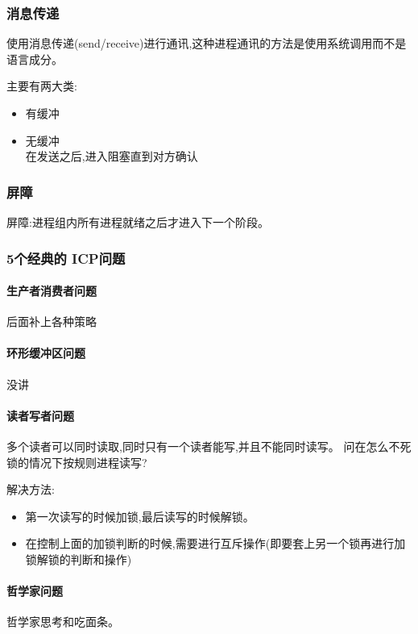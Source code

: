 \documentclass[UTF8,a4paper]{ctexart}
\begin{document}
      \subsubsection{消息传递}
      使用消息传递(send/receive)进行通讯,这种进程通讯的方法是使用系统调用而不是语言成分。

      主要有两大类:
      \begin{itemize}
        \item 有缓冲
        \item 无缓冲\\
        在发送之后,进入阻塞直到对方确认
      \end{itemize}

      \subsubsection{屏障}
      屏障:进程组内所有进程就绪之后才进入下一个阶段。

    \subsubsection{5个经典的 ICP问题}

    \paragraph{生产者消费者问题}

    {\color{red}后面补上各种策略}

    \paragraph{环形缓冲区问题}

    {\color{red}没讲}

    \paragraph{读者写者问题}
    多个读者可以同时读取,同时只有一个读者能写,并且不能同时读写。
    问在怎么不死锁的情况下按规则进程读写?

    解决方法:
    \begin{itemize}
      \item 第一次读写的时候加锁,最后读写的时候解锁。
      \item 在控制上面的加锁判断的时候,需要进行互斥操作(即要套上另一个锁再进行加锁解锁的判断和操作)
    \end{itemize}

    \paragraph{哲学家问题}
    哲学家思考和吃面条。
\end{document}
